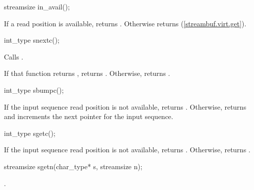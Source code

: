 %
\begin{itemdecl}
streamsize in_avail();
\end{itemdecl}

\begin{itemdescr}
\pnum
\returns
If a read position is available, returns
.
Otherwise returns
 (\ref{streambuf.virt.get}).
\end{itemdescr}

%
\begin{itemdecl}
int_type snextc();
\end{itemdecl}

\begin{itemdescr}
\pnum
\effects
Calls
.

\pnum
\returns
If that function returns
,
returns
.
Otherwise, returns
.
\end{itemdescr}

%
\begin{itemdecl}
int_type sbumpc();
\end{itemdecl}

\begin{itemdescr}
\pnum
\returns
If the input sequence read position is not available,
returns
.
Otherwise, returns
and increments the next pointer for the input sequence.
\end{itemdescr}

%
\begin{itemdecl}
int_type sgetc();
\end{itemdecl}

\begin{itemdescr}
\pnum
\returns
If the input sequence read position is not available,
returns
.
Otherwise, returns
.
\end{itemdescr}

%
\begin{itemdecl}
streamsize sgetn(char_type* s, streamsize n);
\end{itemdecl}

\begin{itemdescr}
\pnum
\returns
{}.
\end{itemdescr}

